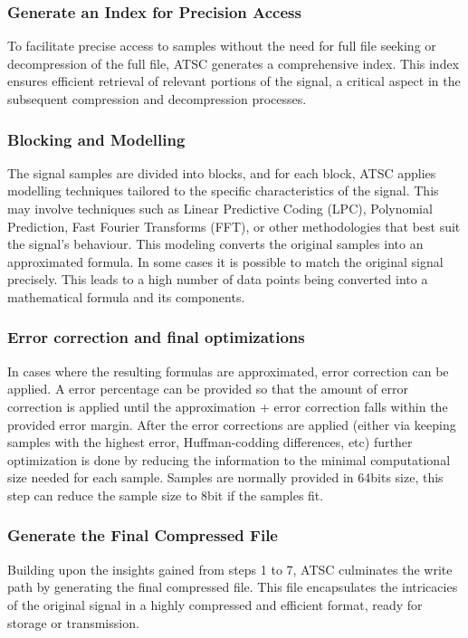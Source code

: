 \documentclass[conference]{IEEEtran}
\begin{document}
\vspace{10pt}
\subsubsection{Generate an Index for Precision Access}
To facilitate precise access to samples without the need for full file seeking or decompression of the full file, ATSC generates a comprehensive index. This index ensures efficient retrieval of relevant portions of the signal, a critical aspect in the subsequent compression and decompression processes.

\vspace{10pt}
\subsubsection{Blocking and Modelling}
The signal samples are divided into blocks, and for each block, ATSC applies modelling techniques tailored to the specific characteristics of the signal. This may involve techniques such as Linear Predictive Coding (LPC), Polynomial Prediction, Fast Fourier Transforms (FFT), or other methodologies that best suit the signal's behaviour. This modeling converts the original samples into an approximated formula. In some cases it is possible to match the original signal precisely. This leads to a high number of data points being converted into a mathematical formula and its components.

\vspace{10pt}
\subsubsection{Error correction and final optimizations}
In cases where the resulting formulas are approximated, error correction can be applied. A error percentage can be provided so that the amount of error correction is applied until the approximation + error correction falls within the provided error margin. After the error corrections are applied (either via keeping samples with the highest error, Huffman-codding differences, etc) further optimization is done by reducing the information to the minimal computational size needed for each sample. Samples are normally provided in 64bits size, this step can reduce the sample size to 8bit if the samples fit.

\vspace{10pt}
\subsubsection{Generate the Final Compressed File}
Building upon the insights gained from steps 1 to 7, ATSC culminates the write path by generating the final compressed file. This file encapsulates the intricacies of the original signal in a highly compressed and efficient format, ready for storage or transmission.
\end{document}
